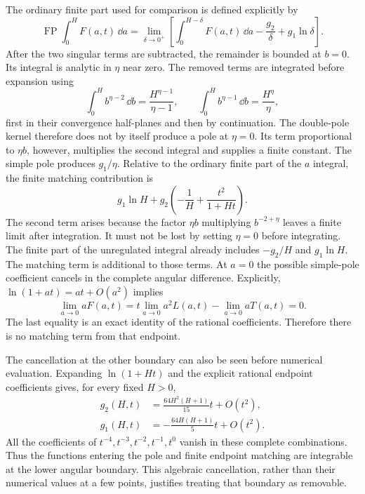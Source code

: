 The ordinary finite part used for comparison is defined explicitly by
\begin{equation}
 \operatorname{FP}\int_0^H F(a,t)\,\dd a
 =\lim_{\delta\to0^+}\left[
 \int_0^{H-\delta}F(a,t)\,\dd a-\frac{g_2}{\delta}
 +g_1\ln\delta\right].
\end{equation}
After the two singular terms are subtracted, the remainder is bounded
at $b=0$. Its integral is analytic in $\eta$ near zero. The removed terms
are integrated before expansion using
\begin{equation}
 \int_0^H b^{\eta-2}\,\dd b=\frac{H^{\eta-1}}{\eta-1},
 \qquad
 \int_0^H b^{\eta-1}\,\dd b=\frac{H^\eta}{\eta},
\end{equation}
first in their convergence half-planes and then by continuation.
The double-pole kernel therefore does not by itself produce a pole at
$\eta=0$. Its term proportional to $\eta b$, however, multiplies the
second integral and supplies a finite constant. The simple pole produces
$g_1/\eta$. Relative to the ordinary finite
part of the $a$ integral, the finite matching contribution is
\begin{equation}
 g_1\ln H+g_2\left(-\frac1H+\frac{t^2}{1+Ht}\right).
\end{equation}
The second term arises because the factor $\eta b$ multiplying
$b^{-2+\eta}$ leaves a finite limit after integration. It must not be
lost by setting $\eta=0$ before integrating. The finite part of the
unregulated integral already includes $-g_2/H$ and $g_1\ln H$.
The matching term is additional to those terms. At $a=0$ the possible
simple-pole coefficient cancels in the complete angular difference.
Explicitly, $\ln(1+at)=at+O(a^2)$ implies
\begin{equation}
 \lim_{a\to0}aF(a,t)
 =t\lim_{a\to0}a^2L(a,t)-\lim_{a\to0}aT(a,t)=0.
\end{equation}
The last equality is an exact identity of the rational coefficients.
Therefore there is no matching term from that endpoint.

The cancellation at the other boundary can also be seen before numerical
evaluation. Expanding $\ln(1+Ht)$ and the explicit rational endpoint
coefficients gives, for every fixed $H>0$,
\begin{align}
 g_2(H,t)&=\frac{64H^2(H+1)}{15}t+O(t^2),\\
 g_1(H,t)&=-\frac{64H(H+1)}5t+O(t^2).
\end{align}
All the coefficients of $t^{-4},t^{-3},t^{-2},t^{-1},t^0$ vanish in
these complete combinations. Thus the functions entering the pole and
finite endpoint matching are integrable at the lower angular boundary.
This algebraic cancellation, rather than their numerical values at a
few points, justifies treating that boundary as removable.

